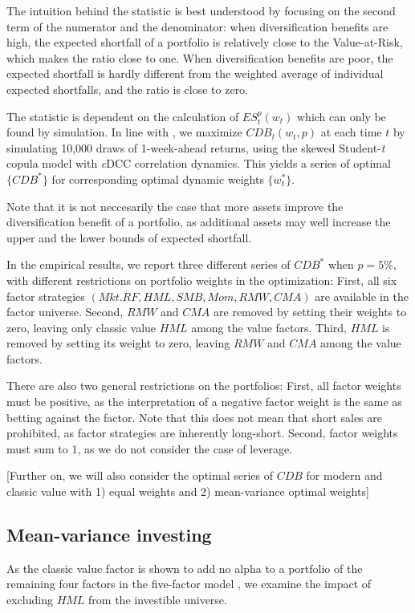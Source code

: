 The intuition behind the statistic is best understood by focusing on the second term of the numerator and the denominator: when diversification benefits are high, the expected shortfall of a portfolio is relatively close to the Value-at-Risk, which makes the ratio close to one. When diversification benefits are poor, the expected shortfall is hardly different from the weighted average of individual expected shortfalls, and the ratio is close to zero.

The statistic is dependent on the calculation of $ES^p_t(w_t)$ which can only be found by simulation. In line with \textcite{ChristoffersenErrunzaJacobLanglois2012}, we maximize $CDB_t(w_t,p)$ at each time $t$ by simulating 10,000 draws of 1-week-ahead returns, using the skewed Student-\textit{t} copula model with \textit{c}DCC correlation dynamics. This yields a series of optimal $\{CDB^*\}$ for corresponding optimal dynamic weights $\{w^*_t\}$.

Note that it is not neccesarily the case that more assets improve the diversification benefit of a portfolio, as additional assets may well increase the upper and the lower bounds of expected shortfall.

In the empirical results, we report three different series of $CDB^*$ when $p=5\%$, with different restrictions on portfolio weights in the optimization: First, all six factor strategies $(Mkt.RF, HML, SMB, Mom, RMW, CMA)$ are available in the factor universe. Second, $RMW$ and $CMA$ are removed by setting their weights to zero, leaving only classic value $HML$ among the value factors. Third, $HML$ is removed by setting its weight to zero, leaving $RMW$ and $CMA$ among the value factors.

There are also two general restrictions on the portfolios: First, all factor weights must be positive, as the interpretation of a negative factor weight is the same as betting against the factor. Note that this does not mean that short sales are prohibited, as factor strategies are inherently long-short. Second, factor weights must sum to 1, as we do not consider the case of leverage.

[Further on, we will also consider the optimal series of $CDB$ for modern and classic value with 1) equal weights and 2) mean-variance optimal weights]

\subsection{Mean-variance investing}
As the classic value factor is shown to add no alpha to a portfolio of the remaining four factors in the five-factor model \autocite{FF2015}, we examine the impact of excluding $HML$ from the investible universe.

